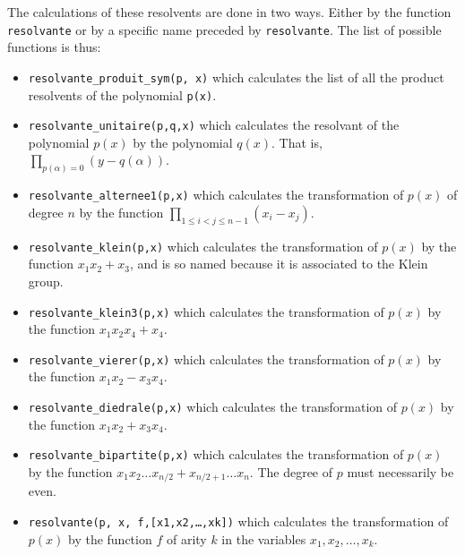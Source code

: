 \documentclass[11pt]{article}
\begin{document}
The calculations of these resolvents are done in two ways.  Either by the
function \texttt{resolvante} or by a specific name preceded by
\texttt{resolvante}.  The list of possible functions is thus:
\begin{itemize}
  \item \texttt{resolvante\_produit\_sym(p, x)}
     which calculates the list of all the
    product resolvents of the polynomial \texttt{p(x)}.
  \item \texttt{resolvante\_unitaire(p,q,x)} 
    which calculates the resolvant of the polynomial $p(x)$ by the polynomial
    $q(x)$.  That is, $\prod_{p(\alpha)=0}(y-q(\alpha))$.
  \item \texttt{resolvante\_alternee1(p,x)} 
    which calculates the transformation of $p(x)$ of degree $n$ by the function
    $\prod_{1\leq i<j\leq n-1} (x_i-x_j)$.
  \item \texttt{resolvante\_klein(p,x)}  which
    calculates the transformation of $p(x)$ by the function $x_1x_2+x_3$, and is
    so named because it is associated to the Klein group.
  \item \texttt{resolvante\_klein3(p,x)}  which
    calculates the transformation of $p(x)$ by the function $x_1x_2x_4+x_4$.
  \item \texttt{resolvante\_vierer(p,x)}  which
    calculates the transformation of $p(x)$ by the function $x_1x_2-x_3x_4$.
  \item \texttt{resolvante\_diedrale(p,x)} 
    which calculates the transformation of $p(x)$ by the function $x_1x_2+x_3x_4$.
  \item \texttt{resolvante\_bipartite(p,x)} 
    which calculates the transformation of $p(x)$ by the function $x_1x_2\ldots
    x_{n/2}+x_{n/2+1}\ldots x_n$.  The degree of $p$ must necessarily be even.
  \item \texttt{resolvante(p, x, f,[x1,x2,\ldots,xk])}
     which calculates the transformation
    of $p(x)$ by the function $f$ of arity $k$ in the variables
    $x_1,x_2,\ldots,x_k$.
\end{itemize}
\end{document}
